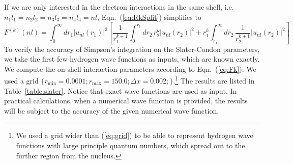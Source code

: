 If we are only interested in the electron interactions in the same shell,
i.e.\ $n_1l_1=n_2l_2=n_3l_3=n_4l_4=nl$, Eqn.~(\ref{eq:RkSplit}) simplifies to
\begin{equation} \label{eq:Fk}
F^{(k)}(nl) =
\int_0^\infty dr_1 |u_{nl}(r_1)|^2
\left[ \frac{1}{r_1^{k+1}} \int_0^{r_1} dr_2\, r_2^k |u_{nl}(r_2)|^2
+ r_1^k \int_{r_1}^\infty dr_2\, \frac{1}{r_2^{k+1}} |u_{nl}(r_2)|^2 \right]
\end{equation}
%
To verify the accuracy of Simpson's integration on the Slater-Condon parameters,
we take the first few hydrogen wave functions as inputs, which are known exactly.
We compute the on-shell interaction parameters according to Eqn.~(\ref{eq:Fk}).
We used a grid $\{r_\text{min}=0.0001;r_\text{max}=150.0;\Delta x=0.002;\}$.\footnote{We
used a grid wider than (\ref{eq:grid}) to be able to represent hydrogen wave functions
with large principle quantum numbers, which spread out to the further region from the nucleus.}
The results are listed in Table~\ref{table:slater}. Notice that exact wave functions
are used as input. In practical calculations, when a numerical wave function is provided,
the results will be subject to the accuracy of the given numerical wave function.

